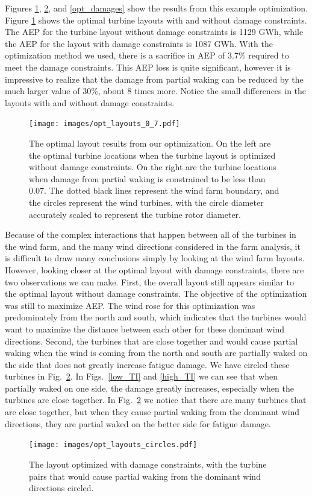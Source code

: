 \documentclass[11pt,letterpaper]{article}
\begin{document}
Figures \ref{layouts}, \ref{circles}, and \ref{opt_damages} show the results from this example optimization. Figure \ref{layouts} shows the optimal turbine layouts with and without damage constraints. The AEP for the turbine layout without damage constraints is 1129 GWh, while the AEP for the layout with damage constraints is 1087 GWh. With the optimization method we used, there is a sacrifice in AEP of 3.7\% required to meet the damage constraints. This AEP loss is quite significant, however it is impressive to realize that the damage from partial waking can be reduced by the much larger value of 30\%, about 8 times more.  
Notice the small differences in the layouts with and without damage constraints. 
% 
\begin{figure}
    \centering
    \texttt{[image: images/opt\_layouts\_0\_7.pdf]}
    \caption{The optimal layout results from our optimization. On the left are the optimal turbine locations when the turbine layout is optimized without damage constraints. On the right are the turbine locations when damage from partial waking is constrained to be less than 0.07. The dotted black lines represent the wind farm boundary, and the circles represent the wind turbines, with the circle diameter accurately scaled to represent the turbine rotor diameter.}
    \label{layouts}
\end{figure}

Because of the complex interactions that happen between all of the turbines in the wind farm, and the many wind directions considered in the farm analysis, it is difficult to draw many conclusions simply by looking at the wind farm layouts. However, looking closer at the optimal layout with damage constraints, there are two observations we can make. First, the overall layout still appears similar to the optimal layout without damage constraints. The objective of the optimization was still to maximize AEP. The wind rose for this optimization was predominately from the north and south, which indicates that the turbines would want to maximize the distance between each other for these dominant wind directions. Second, the turbines that are close together and would cause partial waking when the wind is coming from the north and south are partially waked on the side that does not greatly increase fatigue damage. We have circled these turbines in Fig.~\ref{circles}. In Figs.~\ref{low_TI} and \ref{high_TI} we can see that when partially waked on one side, the damage greatly increases, especially when the turbines are close together. In Fig.~\ref{circles} we notice that there are many turbines that are close together, but when they cause partial waking from the dominant wind directions, they are partial waked on the better side for fatigue damage. 
% 
\begin{figure}
    \centering
    \texttt{[image: images/opt\_layouts\_circles.pdf]}
    \caption{The layout optimized with damage constraints, with the turbine pairs that would cause partial waking from the dominant wind directions circled.}
    \label{circles}
\end{figure}
\end{document}
